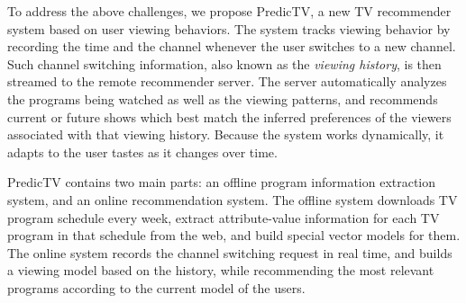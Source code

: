 To address the above challenges, 
we propose PredicTV, a new TV recommender system based on
user viewing behaviors. The system tracks viewing
behavior by recording the time and the channel whenever
the user switches to a new channel.
Such channel switching information,
also known as the {\em viewing history}, is
then streamed to the remote recommender server.
The server automatically analyzes
the programs being watched as well as the viewing patterns,
and recommends current or future shows which best match the inferred
preferences of the viewers associated with that viewing
history. Because the system works dynamically, it
adapts to the user tastes as it changes over time.


PredicTV contains two main parts: an offline program information
extraction system, and an online recommendation system.
The offline system downloads TV program schedule every week,
extract attribute-value information for each TV program in
that schedule from the web, and build special vector models
for them. The online system records the channel switching
request in real time, and builds a viewing model based on the
history, while recommending the most relevant programs according to
the current model of the users.


